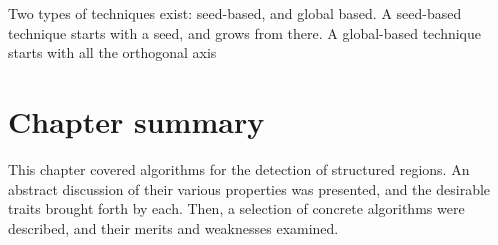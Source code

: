 Two types of techniques exist: seed-based, and global based. A seed-based technique starts with a seed, and grows from there. A global-based technique starts with all the orthogonal axis

\section{Chapter summary}
This chapter covered algorithms for the detection of structured regions. An abstract discussion of their various properties was presented, and the desirable traits brought forth by each. Then, a selection of concrete algorithms were described, and their merits and weaknesses examined.